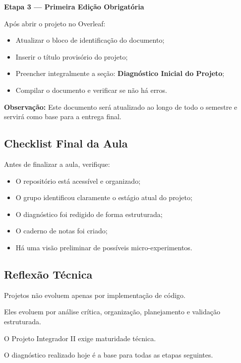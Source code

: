 \newpage
\begin{boxAtividade}

\textbf{Etapa 3 — Primeira Edição Obrigatória}

Após abrir o projeto no Overleaf:

\begin{itemize}
    \item Atualizar o bloco de identificação do documento;
    \item Inserir o título provisório do projeto;
    \item Preencher integralmente a seção:
    \textbf{Diagnóstico Inicial do Projeto};
    \item Compilar o documento e verificar se não há erros.
\end{itemize}

\textbf{Observação:} Este documento será atualizado ao longo de todo o semestre e servirá como base para a entrega final.

\end{boxAtividade}



\newpage


\subsection{Checklist Final da Aula}

\begin{boxAtividade}

Antes de finalizar a aula, verifique:

\begin{itemize}
\item O repositório está acessível e organizado;
\item O grupo identificou claramente o estágio atual do projeto;
\item O diagnóstico foi redigido de forma estruturada;
\item O caderno de notas foi criado;
\item Há uma visão preliminar de possíveis micro-experimentos.
\end{itemize}

\end{boxAtividade}


\subsection*{Reflexão Técnica}

Projetos não evoluem apenas por implementação de código.

Eles evoluem por análise crítica, organização, planejamento e validação estruturada.

O Projeto Integrador II exige maturidade técnica.

O diagnóstico realizado hoje é a base para todas as etapas seguintes.
